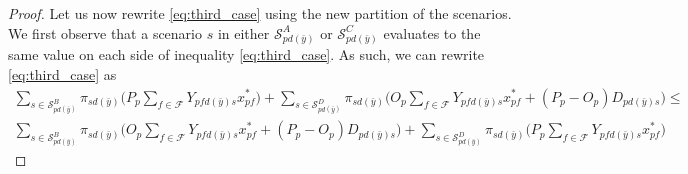 \documentclass[12pt]{article}
\theoremstyle{thmstylethree}%
\begin{document}
\begin{proof}
Let us now rewrite \eqref{eq:third_case} using the new partition of the scenarios. We first observe that a scenario $s$ in either $\mathcal{S}_{pd(\bar{y})}^A$ or $\mathcal{S}_{pd(\bar{y})}^C$ evaluates to the same value on each side of inequality \eqref{eq:third_case}. As such, we can rewrite \eqref{eq:third_case} as
\begin{align}
\label{eq:third_case_simplified}
      \sum_{s\in \mathcal{S}^B_{pd(\bar{y})}} \pi_{sd(\bar{y})} \bigg(P_p \sum_{f \in \mathcal{F}}Y_{pfd(\bar{y})s}x^*_{pf} \bigg) 
      +\sum_{s \in \mathcal{S}^D_{pd(\bar{y})}} \pi_{sd(\bar{y})}\bigg(O_p\sum_{f\in\mathcal{F}}Y_{pfd(\bar{y})s}x^*_{pf}+(P_p-O_p)D_{pd(\bar{y})s}\bigg) \leq  \nonumber \\
      \sum_{s \in \mathcal{S}^B_{pd(\bar{y})}} \pi_{sd(\bar{y})}\bigg(O_p\sum_{f\in\mathcal{F}}Y_{pfd(\bar{y})s}x^*_{pf}+(P_p-O_p)D_{pd(\bar{y})s}\bigg)
     +\sum_{s\in \mathcal{S}^D_{pd(\bar{y})}} \pi_{sd(\bar{y})} \bigg(P_p \sum_{f \in \mathcal{F}}Y_{pfd(\bar{y})s}x^*_{pf} \bigg) 
\end{align}


\end{proof}
\end{document}
